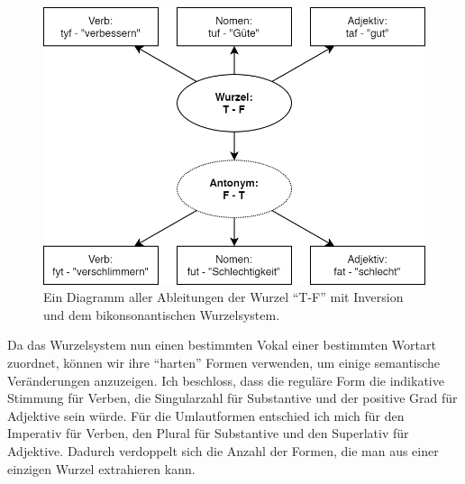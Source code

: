 \documentclass{article}
\begin{document}
\begin{figure}
	\centering
	\includegraphics[scale=0.33]{root_derivations_1.png}
	\caption{Ein Diagramm aller Ableitungen der Wurzel ``T-F'' mit Inversion und dem bikonsonantischen Wurzelsystem.}
	\label{root_derivations_1}
\end{figure}

Da das Wurzelsystem nun einen bestimmten Vokal einer bestimmten Wortart zuordnet, können wir ihre ``harten'' Formen verwenden,
um einige semantische Veränderungen anzuzeigen. Ich beschloss, dass die reguläre Form die indikative Stimmung für Verben,
die Singularzahl für Substantive und der positive Grad für Adjektive sein würde. Für die Umlautformen entschied ich mich
für den Imperativ für Verben, den Plural für Substantive und den Superlativ für Adjektive. Dadurch verdoppelt sich die Anzahl
der Formen, die man aus einer einzigen Wurzel extrahieren kann.
\end{document}

